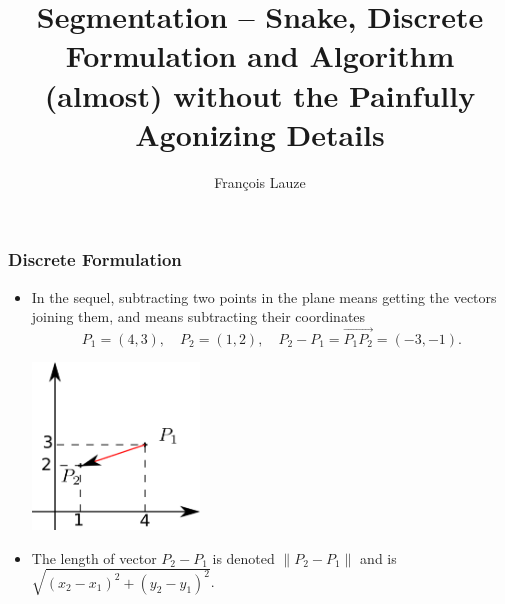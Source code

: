 \documentclass[10pt]{beamer}
\title{Segmentation -- Snake, Discrete Formulation and Algorithm (almost) without the
  Painfully Agonizing Details}
\author[F.~Lauze] %
{Fran{\c c}ois Lauze}
\institute[DIKU] %
{
  Department of Computer Science\\
  University of Copenhagen
}
\date[2012 B2] %
\begin{document}
\maketitle








\begin{frame}
  \frametitle{Discrete Formulation}
  \begin{itemize}
  \item In the sequel, subtracting two points in the plane means getting the vectors joining them, and means subtracting
    their coordinates
    $$
    P_1 = (4,3),\quad P_2 = (1,2),\quad P_2-P_1 = \overrightarrow{P_1P_2} = (-3,-1). 
    $$
    \begin{center}
      \includegraphics[width=0.35\textwidth]{FIGURES/diffpoints}
    \end{center}
  \item The length of vector $P_2-P_1$ is denoted $\|P_2-P_1\|$ and is $\sqrt{(x_2-x_1)^2 + (y_2-y_1)^2}$.
  \end{itemize}
\end{frame}
\end{document}

